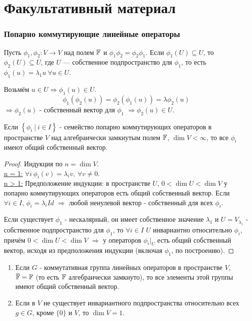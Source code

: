 \section{Факультативный материал}
\subsubsection*{Попарно коммутирующие линейные операторы}
Пусть $\phi_1, \phi_2: V \to V$ над полем $\mathbb{F}$ и $\phi_1 \phi_2 = \phi_2 \phi_1$. Если $\phi_1(U) \subseteq U$, то $\phi_2(U) \subseteq U$, где $U$ — собственное подпространство для $\phi_1$, то есть $\phi_1(u) = \lambda_1 u \ \forall u \in U$.

Возьмём $u \in U \Longrightarrow \phi_1(u) \in U$.
\[\phi_1(\phi_2(u)) = \phi_2(\phi_1(u)) = \lambda \phi_2(u)\]
$\Longrightarrow \phi_2(u)$ - собственный вектор для $\phi_1$ $\Longrightarrow \phi_2(u) \in U$.

\begin{theorem}
    Если $\left\{\phi_i \ | \ i \in I\right\}$ - семейство попарно коммутирующих операторов в пространстве $V$ над алгебраически замкнутым полем $\mathbb{F}$, $\dim{V} < \infty$, то все $\phi_i$ имеют общий собственный вектор.
\end{theorem} 
\begin{proof}
    Индукция по $n = \dim{V}$.\\
    \noindent \underline{n = 1:} $\forall i \ \phi_i(v) = \lambda_i v, \ \forall v \neq 0.$\\
    \noindent \underline{n > 1:} Предположение индукции: в пространстве $U$, $0 < \dim{U} < \dim{V}$ у попарно коммутирующих операторов есть общий собственный вектор. Если $\forall i \in I$, $\phi_i = \lambda_i Id$ $\Longrightarrow$ любой ненулевой вектор - собственный для всех $\phi_i$.

    Если существует $\phi_1$ - нескалярный, он имеет собственное значение $\lambda_1$ и $U = V_{\lambda_1}$ - собственное подпространство для $\phi_1$, то $\forall i \in I$ $U$ инвариантно относительно $\phi_i$, причём $0 < \dim{U} < \dim{V}$ $\Longrightarrow$ у операторов $\phi_i |_U$ есть общий собственный вектор, исходя из предположения индукции (включая $\phi_1$, по построению).
\end{proof} 

\begin{consequense}
    \begin{enumerate}
        $\empty$
        \item Если $G$ - коммутативная группа линейных операторов в пространстве $V$, $\overline{\mathbb{F}} = \mathbb{F}$ (то есть $\mathbb{F}$ алгебраически замкнуто), то все элементы этой группы имеют общий собственный вектор.
        \item Если в $V$ не существует инвариантного подпространства относительно всех $g \in G$, кроме $\{0\}$ и $V$, то $\dim{V} = 1$.
    \end{enumerate}
\end{consequense}

